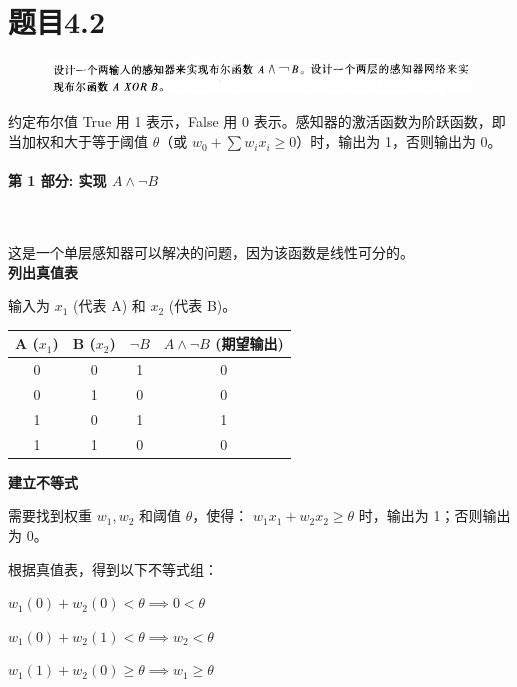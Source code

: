 \documentclass{article}
\begin{document}
\section{题目4.2}

    \begin{figure}[!h]
        \centering
        \includegraphics[width=1.2\linewidth]{image/4.2.png}
        \label{4.2}
    \end{figure}

    约定布尔值 True 用 1 表示，False 用 0 表示。感知器的激活函数为阶跃函数，即当加权和大于等于阈值 $\theta$（或 $w_0 + \sum w_ix_i \ge 0$）时，输出为 1，否则输出为 0。

    \paragraph{第 1 部分: 实现 $A \land \neg B$}~{}
    
    这是一个单层感知器可以解决的问题，因为该函数是线性可分的。\\

    \textbf{列出真值表}
    
    输入为 $x_1$ (代表 A) 和 $x_2$ (代表 B)。    
    \begin{center}
    \begin{tabular}{|c|c|c|c|}
    \hline
    \textbf{A ($x_1$)} & \textbf{B ($x_2$)} & \textbf{$\neg B$} & \textbf{$A \land \neg B$ (期望输出)} \\
    \hline
    0 & 0 & 1 & 0 \\
    0 & 1 & 0 & 0 \\
    1 & 0 & 1 & 1 \\
    1 & 1 & 0 & 0 \\
    \hline
    \end{tabular}
    \end{center}

    \textbf{建立不等式} 
    
    需要找到权重 $w_1, w_2$ 和阈值 $\theta$，使得： $w_1x_1 + w_2x_2 \ge \theta$ 时，输出为 1；否则输出为 0。
    
    根据真值表，得到以下不等式组：
    
    $w_1(0) + w_2(0) < \theta \implies 0 < \theta$
    
    $w_1(0) + w_2(1) < \theta \implies w_2 < \theta$
    
    $w_1(1) + w_2(0) \ge \theta \implies w_1 \ge \theta$
    
\end{document}
